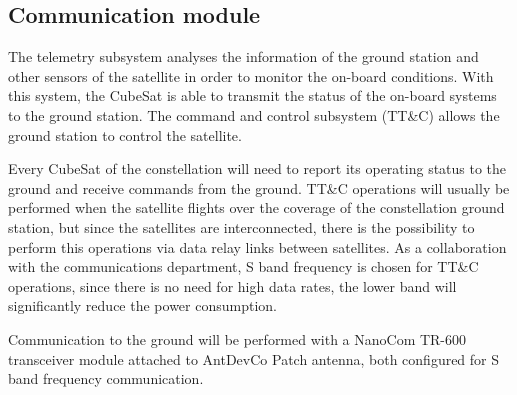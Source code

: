 \subsection{Communication module}

The telemetry subsystem analyses the information of the ground station and other sensors of the satellite in order to monitor the on-board conditions. With this system, the CubeSat is able to transmit the status of the on-board systems to the ground station. The command and control subsystem (TT\&C) allows the ground station to control the satellite.

Every CubeSat of the constellation will need to report its operating status to the ground and receive commands from the ground. TT\&C operations will usually be performed when the satellite flights over the coverage of the constellation ground station, but since the satellites are interconnected, there is the possibility to perform this operations via data relay links between satellites. As a collaboration with the communications department, S band frequency is chosen for TT\&C operations, since there is no need for high data rates, the lower band will significantly reduce the power consumption.

Communication to the ground will be performed with a NanoCom TR-600 transceiver module attached to AntDevCo Patch antenna, both configured for S band frequency communication.